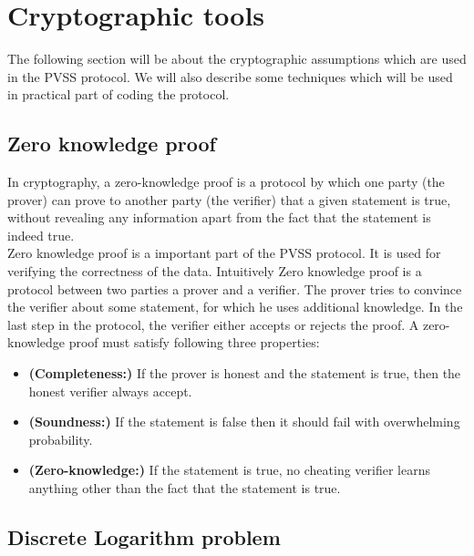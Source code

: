 \section{Cryptographic tools}
The following section will be about the cryptographic assumptions which are used in the PVSS protocol. We will also describe some techniques which will be used in practical part of coding the protocol.


\subsection{Zero knowledge proof} %
In cryptography, a zero-knowledge proof is a protocol by which one party (the prover) can prove to another party (the verifier) that a given statement is true, without revealing any information apart from the fact that the statement is indeed true.\\

\noindent
Zero knowledge proof is a important part of the PVSS protocol. It is used for verifying the correctness of the data. Intuitively Zero knowledge proof is a protocol between two parties a prover and a verifier. The prover tries to convince the verifier about some statement, for which he uses additional knowledge. In the last step in the protocol, the verifier either accepts or rejects the proof. A zero-knowledge proof must satisfy following three properties:

\begin{itemize}
\item  \textnormal{\textbf{(Completeness:)}} If the prover is honest and the statement is true, then the honest verifier always accept. 
\item    \textnormal{\textbf{(Soundness:)}} If the statement is false then it should fail with overwhelming probability. 
\item   \textnormal{\textbf{(Zero-knowledge:)}} If the statement is true, no cheating verifier learns anything other than the fact that the statement is true.
\end{itemize}


\subsection{Discrete Logarithm problem} %
\label{sec:discrete_logarithm_problem}

